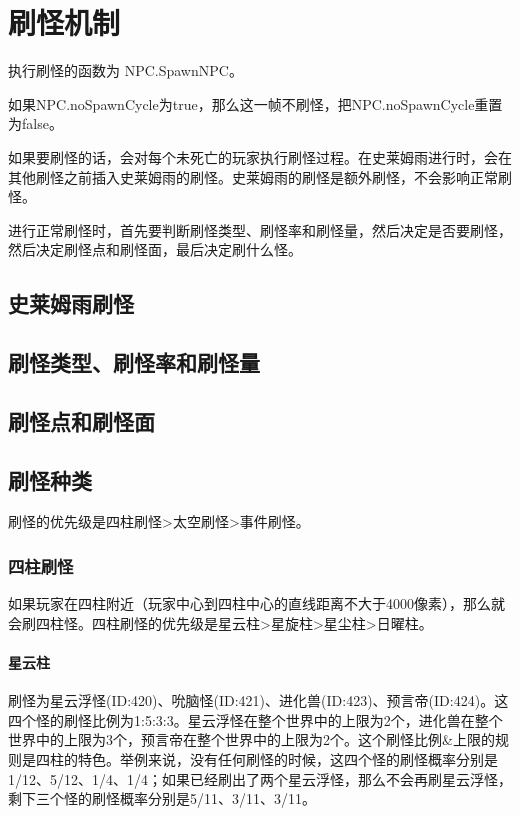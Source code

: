 \chapter{刷怪机制}
执行刷怪的函数为 NPC.SpawnNPC。

如果NPC.noSpawnCycle为true，那么这一帧不刷怪，把NPC.noSpawnCycle重置为false。

如果要刷怪的话，会对每个未死亡的玩家执行刷怪过程。在史莱姆雨进行时，会在其他刷怪之前插入史莱姆雨的刷怪。史莱姆雨的刷怪是额外刷怪，不会影响正常刷怪。

进行正常刷怪时，首先要判断刷怪类型、刷怪率和刷怪量，然后决定是否要刷怪，然后决定刷怪点和刷怪面，最后决定刷什么怪。

\section{史莱姆雨刷怪}

\section{刷怪类型、刷怪率和刷怪量}

\section{刷怪点和刷怪面}

\section{刷怪种类}
刷怪的优先级是四柱刷怪>太空刷怪>事件刷怪。

\subsection{四柱刷怪}
如果玩家在四柱附近（玩家中心到四柱中心的直线距离不大于4000像素），那么就会刷四柱怪。四柱刷怪的优先级是星云柱>星旋柱>星尘柱>日曜柱。

\subsubsection{星云柱}
刷怪为星云浮怪(ID:420)、吮脑怪(ID:421)、进化兽(ID:423)、预言帝(ID:424)。这四个怪的刷怪比例为1:5:3:3。星云浮怪在整个世界中的上限为2个，进化兽在整个世界中的上限为3个，预言帝在整个世界中的上限为2个。这个刷怪比例\&上限的规则是四柱的特色。举例来说，没有任何刷怪的时候，这四个怪的刷怪概率分别是1/12、5/12、1/4、1/4；如果已经刷出了两个星云浮怪，那么不会再刷星云浮怪，剩下三个怪的刷怪概率分别是5/11、3/11、3/11。

